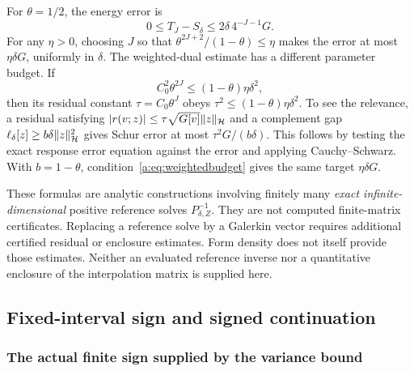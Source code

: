 \documentclass[11pt,a4paper]{article}
\numberwithin{equation}{section}
\theoremstyle{definition}\newtheorem{definition}[theorem]{Definition}
\theoremstyle{remark}\newtheorem{remark}[theorem]{Remark}
\newcommand{\Hh}{\mathcal H}\newcommand{\Hw}{\mathcal H}
\begin{document}
For $\theta=1/2$, the energy error is
\begin{equation}\label{a:eq:halferror}
 0\le T_J-S_\delta\le2\delta\,4^{-J-1}G.
\end{equation}
For any $\eta>0$, choosing $J$ so that
$\theta^{2J+2}/(1-\theta)\le\eta$ makes the error at most $\eta\delta G$, uniformly in $\delta$. The weighted-dual estimate has a different parameter budget. If
\begin{equation}\label{a:eq:weightedbudget}
 C_0^2\theta^{2J}\le(1-\theta)\eta\delta^2,
\end{equation}
then its residual constant $\tau=C_0\theta^J$ obeys
$\tau^2\le(1-\theta)\eta\delta^2$.
To see the relevance, a residual satisfying
$|r(v;z)|\le\tau\sqrt{G[v]}\norm z_{\Hh}$ and a complement gap
$\ell_\delta[z]\ge b\delta\norm z_{\Hh}^2$ gives Schur error at most
$\tau^2G/(b\delta)$. This follows by testing the exact response error equation against the error and applying Cauchy--Schwarz. With $b=1-\theta$, condition~\eqref{a:eq:weightedbudget} gives the same target $\eta\delta G$.

These formulas are analytic constructions involving finitely many \emph{exact infinite-dimensional} positive reference solves $P_{\delta,Z}^{-1}$. They are not computed finite-matrix certificates. Replacing a reference solve by a Galerkin vector requires additional certified residual or enclosure estimates. Form density does not itself provide those estimates. Neither an evaluated reference inverse nor a quantitative enclosure of the interpolation matrix is supplied here.

\subsection{Fixed-interval sign and signed continuation}\label{a:sec:continuation}

\subsubsection{The actual finite sign supplied by the variance bound}
\end{document}
